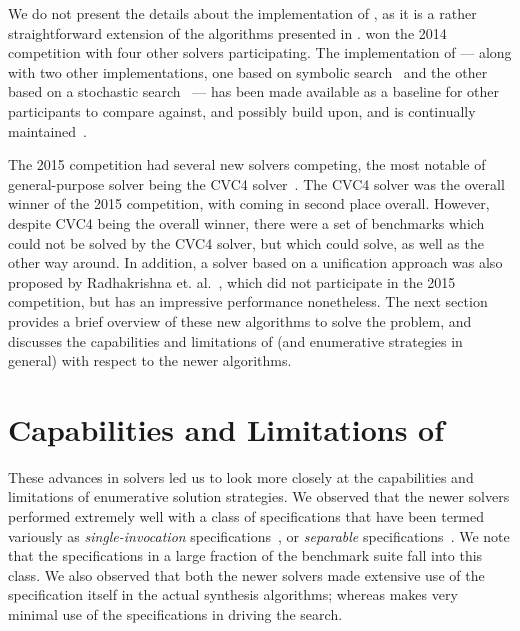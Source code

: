 We do not present the details about the implementation of \esolver, as
it is a rather straightforward extension of the algorithms presented
in . \esolver won the 2014 \sygusbody
competition with four other solvers participating. The implementation
of \esolver --- along with two other implementations, one based on
symbolic search~\cite{gulwani-pldi-11,jha-10} and the other based on a
stochastic search~\cite{schkufza-13} --- has been made
available as a baseline for other participants to
compare against, and possibly build upon, and is continually
maintained~\cite{sygus-solvers}.

The 2015 \sygusbody competition had several new solvers competing, the
most notable of general-purpose solver being the CVC4
solver~\cite{reynolds-15}. The CVC4 solver was the overall winner of
the 2015 \sygusbody competition, with \esolver coming in second place
overall. However, despite CVC4 being the overall winner, there were a
set of benchmarks which could not be solved by the CVC4 solver, but
which \esolver could solve, as well as the other way around. In
addition, a solver based on a unification approach was also proposed
by Radhakrishna et. al.~\cite{radhakrishna-15}, which did not
participate in the 2015 \sygusbody competition, but has an impressive
performance nonetheless. The next section provides a brief overview of
these new algorithms to solve the \sygusbody problem, and discusses the
capabilities and limitations of \esolver (and enumerative strategies
in general) with respect to the newer algorithms.

\section[Capabilities and Limitations of \tocsc{esolver}]
{Capabilities and Limitations of }
These advances in \sygusbody solvers led us to look more closely at the
capabilities and limitations of enumerative solution
strategies. We observed that the newer solvers performed
extremely well with a class of specifications that have been termed
variously as \emph{single-invocation}
specifications~\cite{reynolds-15}, or \emph{separable}
specifications~\cite{radhakrishna-15}. We note that the specifications
in a large fraction of the \sygusbody benchmark suite fall into this
class. We also observed that both the newer solvers made
extensive use of the specification itself in the actual synthesis
algorithms; whereas \esolver makes very minimal use of the
specifications in driving the search.


